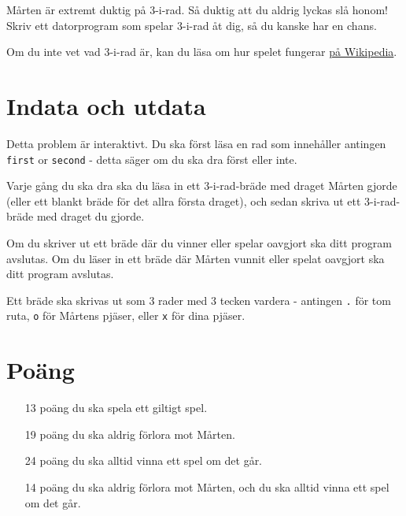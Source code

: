
Mårten är extremt duktig på 3-i-rad. Så duktig att du aldrig lyckas slå honom! Skriv ett datorprogram som spelar 3-i-rad åt dig, så du kanske har en chans.

Om du inte vet vad 3-i-rad är, kan du läsa om hur spelet fungerar \href{https://sv.wikipedia.org/wiki/Tre_i_rad}{på Wikipedia}.

\section*{Indata och utdata}
Detta problem är interaktivt. Du ska först läsa en rad som innehåller antingen \texttt{first} or \texttt{second} - detta säger om du ska dra först eller inte.

Varje gång du ska dra ska du läsa in ett 3-i-rad-bräde med draget Mårten gjorde
(eller ett blankt bräde för det allra första draget),
och sedan skriva ut ett 3-i-rad-bräde med draget du gjorde.

Om du skriver ut ett bräde där du vinner eller spelar oavgjort ska ditt program avslutas. Om du läser in ett bräde där Mårten vunnit eller spelat oavgjort ska ditt program avslutas.

Ett bräde ska skrivas ut som 3 rader med 3 tecken vardera - antingen \texttt{.} för tom ruta, \texttt{o} för Mårtens pjäser, eller \texttt{x} för dina pjäser.

\section*{Poäng}

\begin{enumerate}
	\item[13 poäng] du ska spela ett giltigt spel.
	\item[19 poäng] du ska aldrig förlora mot Mårten.
	\item[24 poäng] du ska alltid vinna ett spel om det går.
	\item[14 poäng] du ska aldrig förlora mot Mårten, och du ska alltid vinna ett spel om det går.
\end{enumerate}

